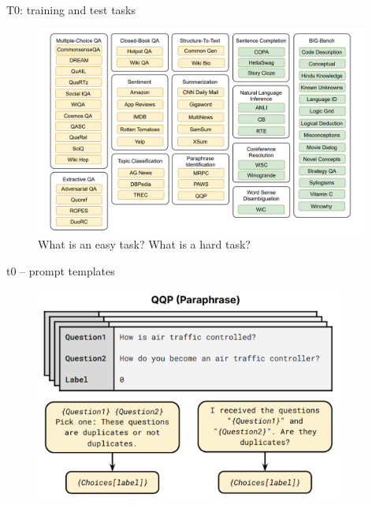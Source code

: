 
\begin{frame}{T0: training and test tasks}

\vfill
	
	\begin{figure}
		\centering
		\includegraphics[width = 11cm]{figure/81-t0-data.png}\\ 
		 \ques
		What is an easy task? What is a hard task?
	\end{figure}

\vfill

\end{frame}


\begin{frame}{t0 -- prompt templates}

\vfill
	
	\begin{figure}
		\centering
		\includegraphics[height=7cm]{figure/t0ex1}\\ 
	\end{figure}

\vfill

\end{frame}

